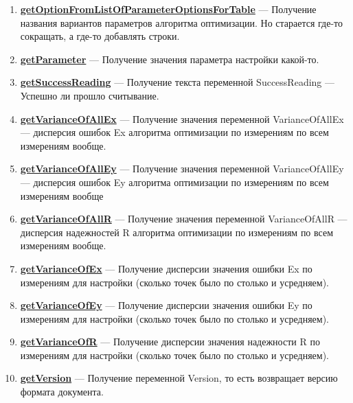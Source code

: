 \documentclass[a4paper,12pt]{article}
\begin{document}
\begin{enumerate}
	\item \textbf{\hyperref[getOptionFromListOfParameterOptionsForTable]{getOptionFromListOfParameterOptionsForTable}} --- Получение названия вариантов параметров алгоритма оптимизации. Но старается где-то сокращать, а где-то добавлять строки.
	
	\item \textbf{\hyperref[getParameter]{getParameter}} --- Получение значения параметра настройки какой-то.
	
	\item \textbf{\hyperref[getSuccessReading]{getSuccessReading}} --- Получение текста переменной SuccessReading --- Успешно ли прошло считывание.
	
	\item \textbf{\hyperref[getVarianceOfAllEx]{getVarianceOfAllEx}} --- Получение значения переменной VarianceOfAllEx --- дисперсия ошибок Ex алгоритма оптимизации по измерениям по всем измерениям вообще.
	
	\item \textbf{\hyperref[getVarianceOfAllEy]{getVarianceOfAllEy}} --- Получение значения переменной VarianceOfAllEy --- дисперсия ошибок Ey алгоритма оптимизации по измерениям по всем измерениям вообще
	
	\item \textbf{\hyperref[getVarianceOfAllR]{getVarianceOfAllR}} --- Получение значения переменной VarianceOfAllR --- дисперсия надежностей R алгоритма оптимизации по измерениям по всем измерениям вообще.
	
	\item \textbf{\hyperref[getVarianceOfEx]{getVarianceOfEx}} --- Получение дисперсии значения ошибки Ex по измерениям для настройки (сколько точек было по столько и усредняем).
	
	\item \textbf{\hyperref[getVarianceOfEy]{getVarianceOfEy}} --- Получение дисперсии значения ошибки Ey по измерениям для настройки (сколько точек было по столько и усредняем).
	
	\item \textbf{\hyperref[getVarianceOfR]{getVarianceOfR}} --- Получение дисперсии значения надежности R по измерениям для настройки (сколько точек было по столько и усредняем).
	
	\item \textbf{\hyperref[getVersion]{getVersion}} --- Получение переменной Version, то есть возвращает версию формата документа.
	
\end{enumerate}
\end{document}
